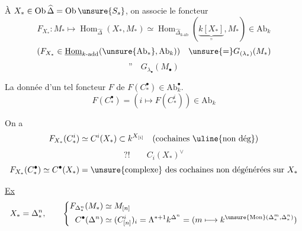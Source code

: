 
À  $X_*\in\operatorname{Ob}\widehat\Delta=\operatorname{Ob}\unsure{S_s}$,
on associe le foncteur
\[
F_{X_*}:M_*\longmapsto\operatorname{Hom}_{\widehat\Delta}(X_*,M_*)
\simeq\operatorname{Hom}_{\widehat\Delta_{k\text{-ab}}}
(\underbrace{k[X_*]}_{\text{''}},M_*)\in\mathrm{Ab}_k
\]
\[
(F_{X_*}\in\underline{\operatorname{Hom}}_{k\text{-add}}(\unsure{\mathrm{Ab}_*},\mathrm{Ab}_k))
\quad\unsure{=}G_{(\lambda_*)}(M_*)
\]
\[
\text{''}\quad G_{\lambda_\bullet}(M_\bullet)
\]

La donnée d'un tel foncteur $F$ 
 de $F(C_*^\bullet)\in\mathrm{Ab}_k^\bullet$.
\[
F(C_*^\bullet)=(i\longmapsto F(C_*^i))\in\mathrm{Ab}_k
\]

On a
\[
F_{X_*}(C_*^i)\simeq C^i(X_*)\subset k^{X_{[i]}}
\quad(\text{cochaines \uline{non dég}})
\]
\[
?!\qquad C_i(X_*)^\vee
\]
\[
F_{X_*}(C_*^\bullet)\simeq C^\bullet(X_*)
=\unsure{\text{complexe}}\ \text{des cochaines non dégénérées sur }X_*
\]

\uline{Ex}
\[
X_* =\Delta_*^n,\qquad
\left\{\begin{aligned}
F_{\Delta_*^n}(M_*)&\simeq M_{[n]}\\
C^\bullet(\Delta^n)&\simeq(C_{[n]}^i)_i
=\Lambda^{*+1}k^{\Delta^n}
=(m\longmapsto k^{\unsure{\operatorname{Mon}}(\Delta_*^m,\Delta_*^n)})
\end{aligned}\right.
\]

